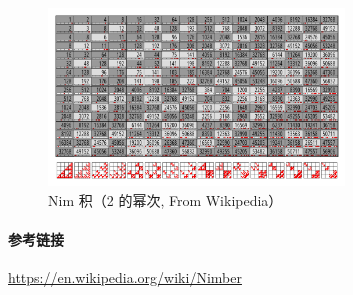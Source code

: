 \begin{figure}[h]
    \label{img:nim-prod-pow2}
    \includegraphics[width=0.7\textwidth]{img/Nimber-multiplication-of-powers-of-two.svg}
    \caption{Nim 积（2 的幂次, From Wikipedia）}
\end{figure}

\paragraph{参考链接}

\url{https://en.wikipedia.org/wiki/Nimber}
